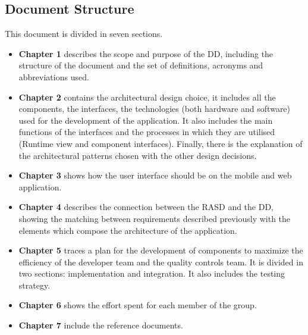 \subsection{Document Structure}
This document is divided in seven sections.
\begin{itemize}
    \item \textbf{Chapter 1} describes the scope and purpose of the DD, including the structure of the document and the set of definitions, acronyms and abbreviations used.
    
    \item \textbf{Chapter 2} contains the architectural design choice, it includes all the components, the interfaces, the technologies (both hardware and software) used for the development of the application. It also includes the main functions of the interfaces and the processes in which they are utilised (Runtime view and component interfaces). Finally, there is the explanation of the architectural patterns chosen with the other design decisions.
    
    \item \textbf{Chapter 3} shows how the user interface should be on the mobile and web application.
    
    \item \textbf{Chapter 4} describes the connection between the RASD and the DD, showing the matching between requirements described previously with the elements which compose the architecture of the application.
    
    \item \textbf{Chapter 5} traces a plan for the development of components to maximize the efficiency of the developer team and the quality controls team. It is divided in two sections: implementation and integration. It also includes the testing strategy.
    
    \item \textbf{Chapter 6} shows the effort spent for each member of the group.
    
    \item \textbf{Chapter 7} include the reference documents.
 \end{itemize}

\vfill